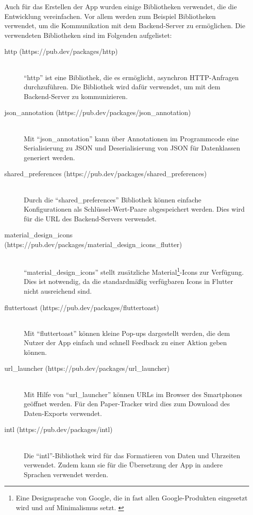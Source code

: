 Auch für das Erstellen der App wurden einige Bibliotheken verwendet, die die Entwicklung vereinfachen.
Vor allem werden zum Beispiel Bibliotheken verwendet, um die Kommunikation mit dem Backend-Server zu ermöglichen.
Die verwendeten Bibliotheken sind im Folgenden aufgelistet:
\begin{description}
	\item[http (https://pub.dev/packages/http)] \hfill \\
		\enquote{http} ist eine Bibliothek, die es ermöglicht, asynchron \gls{HTTP}-Anfragen durchzuführen. Die Bibliothek wird dafür verwendet, um mit dem Backend-Server zu kommunizieren.
	\item[json\_annotation (https://pub.dev/packages/json\_annotation)] \hfill \\
		Mit \enquote{json\_annotation} kann über Annotationen im Programmcode eine Serialisierung zu \gls{JSON} und Deserialisierung von \gls{JSON} für Datenklassen generiert werden.
	\item[shared\_preferences (https://pub.dev/packages/shared\_preferences)] \hfill \\
		Durch die \enquote{shared\_preferences} Bibliothek können einfache Konfigurationen als Schlüssel-Wert-Paare abgespeichert werden. Dies wird für die \gls{URL} des Backend-Servers verwendet.
	\item[material\_design\_icons (https://pub.dev/packages/material\_design\_icons\_flutter)] \hfill \\
		\enquote{material\_design\_icons} stellt zusätzliche Material\footnote{Eine Designsprache von
			Google, die in fast allen Google-Produkten eingesetzt wird und auf Minimalismus setzt.
			\cite{Google2020}}-Icons zur Verfügung. Dies ist notwendig, da die standardmäßig verfügbaren Icons in Flutter nicht ausreichend sind.
	\item[fluttertoast (https://pub.dev/packages/fluttertoast)] \hfill \\
		Mit \enquote{fluttertoast} können kleine Pop-ups dargestellt werden, die dem Nutzer der App einfach und schnell Feedback zu einer Aktion geben können.
	\item[url\_launcher (https://pub.dev/packages/url\_launcher)] \hfill \\
		Mit Hilfe von \enquote{url\_launcher} können \gls{URL}s im Browser des Smartphones geöffnet
		werden. Für den Paper-Tracker wird dies zum Download des Daten-Exports verwendet.
	\item[intl (https://pub.dev/packages/intl)] \hfill \\
		Die \enquote{intl}-Bibliothek wird für das Formatieren von Daten und Uhrzeiten verwendet. Zudem kann sie für die Übersetzung der App in andere Sprachen verwendet werden.
\end{description}

